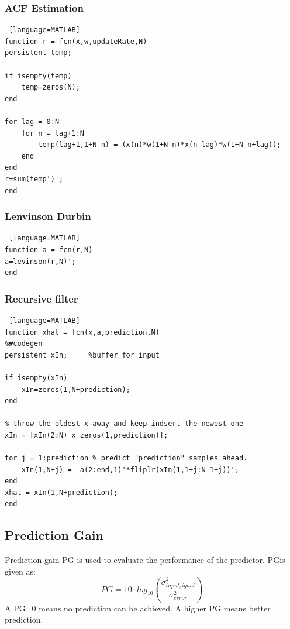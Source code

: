 \subsubsection{ACF Estimation}
\begin{lstlisting} [language=MATLAB]
function r = fcn(x,w,updateRate,N)
persistent temp;

if isempty(temp)
	temp=zeros(N);
end

for lag = 0:N
	for n = lag+1:N
		temp(lag+1,1+N-n) = (x(n)*w(1+N-n)*x(n-lag)*w(1+N-n+lag));
	end
end
r=sum(temp')';
end
\end{lstlisting}

\subsubsection{Lenvinson Durbin}
\begin{lstlisting} [language=MATLAB]
function a = fcn(r,N)
a=levinson(r,N)';
end
\end{lstlisting}

\subsubsection{Recursive filter}
\begin{lstlisting} [language=MATLAB]
function xhat = fcn(x,a,prediction,N)
%#codegen
persistent xIn;     %buffer for input

if isempty(xIn)
	xIn=zeros(1,N+prediction);
end

% throw the oldest x away and keep indsert the newest one
xIn = [xIn(2:N) x zeros(1,prediction)]; 

for j = 1:prediction % predict "prediction" samples ahead. 
	xIn(1,N+j) = -a(2:end,1)'*fliplr(xIn(1,1+j:N-1+j))';
end
xhat = xIn(1,N+prediction);
end
\end{lstlisting}

\subsection{Prediction Gain}
Prediction gain PG is used to evaluate the performance of the predictor. PGis given as:
\begin{equation}
	PG=10 \cdot log_{10}(\frac{\sigma^2_{input_signal}}{\sigma^2_{error}})
\end{equation} 
A PG=0 means no prediction can be achieved. A higher PG means better prediction.


